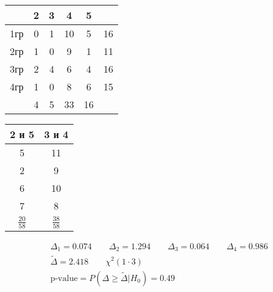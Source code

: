\documentclass{article}
\begin{document}
\begin{eg}[Коллоквиум 2023]
  \phantom{.}

  \begin{center}
  \begin{tabular}{| c | c | c | c | c | c |}
    \hline
    & 2 & 3 & 4 & 5 & \\
    \hline
    1гр & 0 & 1 & 10 & 5 & 16 \\ 
    \hline
    2гр & 1 & 0 & 9 & 1 & 11 \\ 
    \hline
    3гр & 2 & 4 & 6 & 4 & 16 \\ 
    \hline
    4гр & 1 & 0 & 8 & 6 & 15 \\ 
    \hline
        & 4 & 5 & 33 & 16 & \\
    \hline
  \end{tabular}
  \end{center}
  \begin{center}
  \begin{tabular}{| c | c |}
    \hline
    2 и 5 & 3 и 4 \\ 
    \hline
    5 & 11 \\
    \hline
    2 & 9 \\ 
    \hline
    6 & 10 \\
    \hline
    7 & 8 \\
    \hline
    $\frac{20}{58}$ & $\frac{38}{58}$ \\
    \hline
  \end{tabular}
  \end{center}
  \begin{gather*}
    \Delta_1=0.074 \qquad \Delta_2=1.294 \qquad \Delta_3=0.064 \qquad \Delta_4=0.986 \\ 
    \tilde{\Delta}=2.418 \qquad \chi^{2}(1 \cdot 3) \\ 
    \text{p-value}=P(\Delta \ge \tilde{\Delta}|H_0)=0.49
  \end{gather*}
\end{eg}
\end{document}
